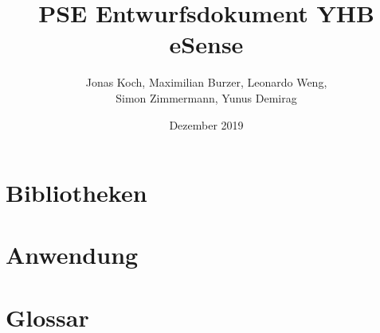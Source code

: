 \documentclass[12pt,a4paper,titlepage,ngerman]{article}
\title{PSE Entwurfsdokument YHB eSense}
\author{Jonas Koch, Maximilian Burzer, Leonardo Weng, \\ Simon Zimmermann, Yunus Demirag}
\date{Dezember 2019}
\begin{document}
	
	\part{Bibliotheken}
	
	
	\part{Anwendung}
	
	
	
	\part{Glossar}
	
\end{document}
